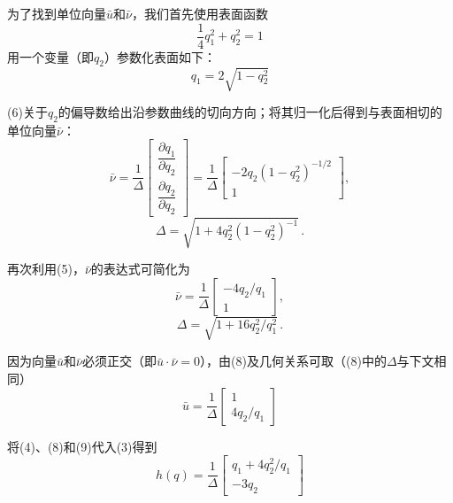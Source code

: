 \documentclass[12pt,a4paper]{ctexart}
\begin{document}
为了找到单位向量$\bar{u}$和$\bar{\nu}$，我们首先使用表面函数
\begin{equation}
\frac{1}{4}q_1^2 + q_2^2 = 1
\end{equation}
用一个变量（即$q_2$）参数化表面如下：
\begin{equation}\tag{5}
q_1 = 2\sqrt{1 - q_2^2}
\end{equation}

(6)关于$q_2$的偏导数给出沿参数曲线的切向方向；将其归一化后得到与表面相切的单位向量$\bar{\nu}$：
\begin{equation}\tag{7}
\bar{\nu} = \frac{1}{\Delta}
\begin{bmatrix} \dfrac{\partial q_1}{\partial q_2} \\ \dfrac{\partial q_2}{\partial q_2} \end{bmatrix}
= \frac{1}{\Delta}
\begin{bmatrix} -2q_2(1-q_2^2)^{-1/2} \\ 1 \end{bmatrix},
\end{equation}
\begin{equation*}
\Delta = \sqrt{1 + 4q_2^2(1-q_2^2)^{-1}} \, .
\end{equation*}

再次利用(5)，$\bar{\nu}$的表达式可简化为
\begin{equation}\tag{8}
\bar{\nu} = \frac{1}{\Delta}
\begin{bmatrix} -4q_2/q_1 \\ 1 \end{bmatrix},
\end{equation}
\begin{equation*}
\Delta = \sqrt{1 + 16q_2^2/q_1^2} \, .
\end{equation*}

因为向量$\bar{u}$和$\bar{\nu}$必须正交（即$\bar{u} \cdot \bar{\nu} = 0$），由(8)及几何关系可取（(8)中的$\Delta$与下文相同）
\begin{equation}\tag{9}
\bar{u} = \frac{1}{\Delta} \begin{bmatrix} 1 \\ 4q_2/q_1 \end{bmatrix}
\end{equation}

将(4)、(8)和(9)代入(3)得到
\begin{equation}\tag{10}
h(q) = \frac{1}{\Delta} \begin{bmatrix} q_1 + 4q_2^2/q_1 \\ -3q_2 \end{bmatrix}
\end{equation}
\end{document}
